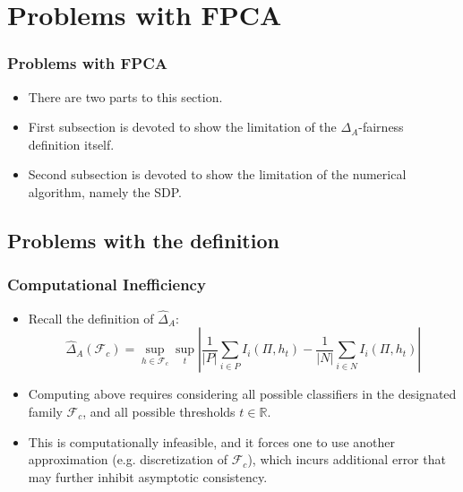 \documentclass{beamer}
\begin{document}

\section{Problems with FPCA}

\begin{frame}
	\frametitle{Problems with FPCA}
	\begin{itemize}
		\item There are two parts to this section.
		
		\item First subsection is devoted to show the limitation of the $\Delta_A$-fairness definition itself.
		
		\item Second subsection is devoted to show the limitation of the numerical algorithm, namely the SDP.
	\end{itemize}
\end{frame}

\subsection{Problems with the definition}

\begin{frame}
	\frametitle{Computational Inefficiency}
	\begin{itemize}
		\item Recall the definition of $\widehat{\Delta}_A$:
		\begin{equation*}
			\widehat{\Delta}_A(\mathcal{F}_c) = \sup_{h \in \mathcal{F}_c} \sup_t \left| \frac{1}{|P|} \sum_{i \in P} I_i(\Pi, h_t) - \frac{1}{|N|} \sum_{i \in N} I_i(\Pi, h_t) \right|
		\end{equation*}
		
		\item Computing above requires considering all possible classifiers in the designated family $\mathcal{F}_c$, and all possible thresholds $t \in \mathbb{R}$.
		
		\item This is computationally infeasible, and it forces one to use another approximation (e.g. discretization of $\mathcal{F}_c$), which incurs additional error that may further inhibit asymptotic consistency.
	\end{itemize}
\end{frame}
\end{document}
